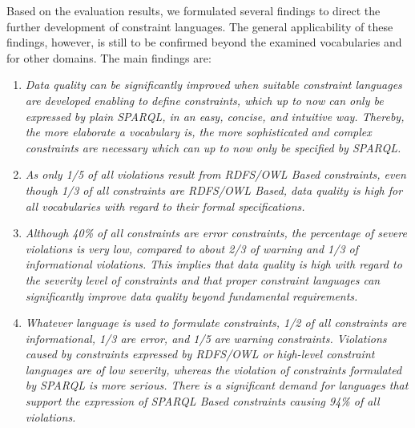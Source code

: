 \documentclass[conference]{IEEEtran}
\begin{document}
Based on the evaluation results, we formulated several findings to direct the further development of constraint languages. The general applicability of these findings, however, is still to be confirmed beyond the examined vocabularies and for other domains.
The main findings are: 

\begin{enumerate}
\item
\emph{Data quality can be significantly improved when suitable constraint languages are developed enabling to define 
constraints, which up to now can only be expressed by plain SPARQL, in an easy, concise, and intuitive way. Thereby, the more elaborate a vocabulary is, the more sophisticated and complex constraints are necessary which can up to now only be specified by SPARQL.}
\item
\emph{As only 1/5 of all violations result from RDFS/OWL Based constraints, even though 1/3 of all constraints are RDFS/OWL Based, data quality is high for all vocabularies with regard to their formal specifications.}  
\item
\emph{Although 40\% of all constraints are error constraints, the percentage of severe violations is very low, compared to about 2/3 of warning and 1/3 of informational violations. This implies that data quality is high with regard to the severity level of constraints and that proper constraint languages can significantly improve data quality beyond fundamental requirements.}
\item
\emph{Whatever language is used to formulate constraints, 1/2 of all constraints are informational, 1/3 are error, and 1/5 are warning constraints. 
Violations caused by constraints expressed by RDFS/OWL or high-level constraint languages are of low severity, whereas the violation of constraints formulated by SPARQL is more serious.
There is a significant demand for languages that support the expression of SPARQL Based constraints causing 94\% of all violations.}
\end{enumerate}

\end{document}
